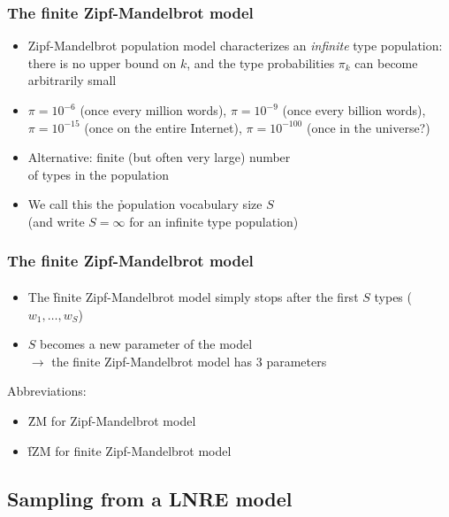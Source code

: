 \documentclass[t]{beamer} %
\begin{document}
\begin{frame}
  \frametitle{The finite Zipf-Mandelbrot model}

  \begin{itemize}
  \item Zipf-Mandelbrot population model characterizes an \emph{infinite} type
    population: there is no upper bound on $k$, and the type probabilities
    $\pi_k$ can become arbitrarily small
  \item $\pi = 10^{-6}$ (once every million words), $\pi = 10^{-9}$ (once
    every billion words), $\pi = 10^{-15}$ (once on the entire Internet), $\pi
    = 10^{-100}$ (once in the universe?)%
    \pause
  \item Alternative: finite (but often very large) number\\
    of types in the population
  \item We call this the \h{population vocabulary size} $S$\\
    (and write $S = \infty$ for an infinite type population)
  \end{itemize}
\end{frame}

\begin{frame}
  \frametitle{The finite Zipf-Mandelbrot model}
  \framesubtitle{\citet{Evert:04}}

  \begin{itemize}
  \item The \h{finite Zipf-Mandelbrot} model simply stops after the first $S$
    types ($w_1, \ldots, w_S$)
  \item $S$ becomes a new parameter of the model\\
    $\to$ the finite Zipf-Mandelbrot model has 3 parameters
  \end{itemize}

  Abbreviations: 
  \begin{itemize}
  \item \h{ZM} for Zipf-Mandelbrot model
  \item \h{fZM} for finite Zipf-Mandelbrot model
  \end{itemize}
\end{frame}

\subsection{Sampling from a LNRE model}
\end{document}
